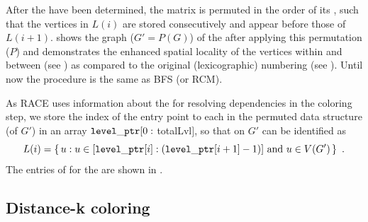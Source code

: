 
After the \levels have been determined, the matrix is permuted in the
order of its \levels, such that the vertices in $L(i)$ are stored
consecutively and appear before those of
$L(i+1)$.  shows the graph ($G' = P(G)$)
of the \stex after applying this permutation ($P$) and demonstrates
the enhanced spatial locality of the vertices within and between
\levels (see ) as compared to the original
(lexicographic) numbering (see ).
Until now the procedure is the same as \acrshort{BFS} (or
\acrshort{RCM}).

As \acrshort{RACE} uses information about the \levels for resolving
dependencies in the coloring step, we store the index of the entry point to each
\level in the permuted data structure (of $G'$) in an array
${\tt level\_ptr}[0:$ \acrshort{totalLvl}$]$, so that \levels on $G'$ can be
identified as
\begin{equation*}
  L(i) = \set{ u : u \in [\levelPtr[i]:(\levelPtr[i+1]-1)]
    \text{ and } u \in V(G')}\eos
\end{equation*}
The entries of \levelPtr for the \stex are shown in . 
 
\subsection{Distance-k coloring} \label{subsec:DK}

